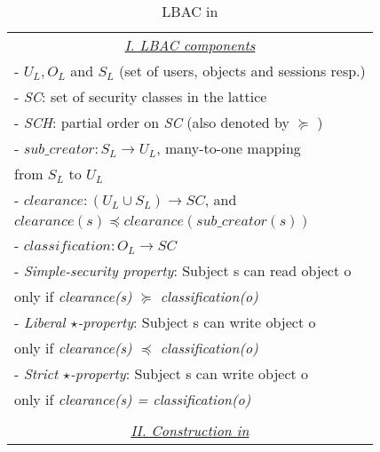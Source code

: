 \newcommand{\userLBAC}{U_{L}}
\newcommand{\objectLBAC}{O_{L}}
\newcommand{\sessionLBAC}{S_{L}}
\newcommand{\sessionUser}{sub\_creator}
\newcommand{\clearance}{clearance}
\newcommand{\classification}{classification}

\begin{table}
	\centering
	\caption{ LBAC in \labacOneOneOne{}} %
	\label{tab:lbac-in-labac}
	\begin{tabular}{|l|}						
		\hline					
		\multicolumn{1}{|c|}{\underline{\textit{I. LBAC components }}}\\				 
		 - $\userLBAC, \objectLBAC$ and $\sessionLBAC$ (set of users, objects and sessions resp.) \\
		 -  \textit{SC}:  set of security classes in the lattice \\
		 -  \textit{SCH}: partial order on \textit{SC} (also denoted by $\succeq$ ) \\
		 - $\sessionUser: \sessionLBAC \to \userLBAC$, many-to-one mapping \\ \hfill from $\sessionLBAC$ to $\userLBAC$\\
		 - $\clearance: (\userLBAC \cup \sessionLBAC) \to SC$,  and \\ \hfill $clearance(s) \preceq \clearance(\sessionUser(s))$\\
		 - $\classification: \objectLBAC \to SC$\\		
	
		 - \textit{Simple-security property}: Subject s can read object o \\ \hfill only if \textit{clearance(s) $\succeq$ classification(o)}\\
		 - \textit{Liberal $\star$-property}: Subject s can write object o\\ \hfill only if  \textit{clearance(s) $\preceq$ classification(o)}\\
		  - \textit{Strict $\star$-property}: Subject s can write object o\\ \hfill only if  \textit{clearance(s) = classification(o)}\\
		  
		  	\\	  \multicolumn{1}{|c|}{\underline{\textit{II. Construction in \labacOneOneOne{} }}} \\
		  

\end{tabular}
\end{table}
